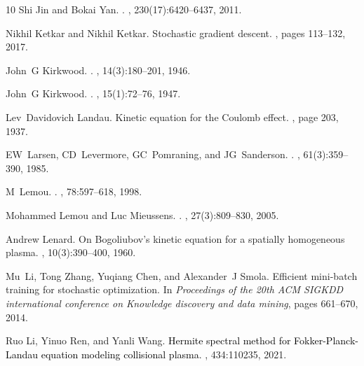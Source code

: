 \documentclass[preprint,1p,times]{elsarticle}
\theoremstyle{definition}
\theoremstyle{remark}
\newcommand{\tcr}[1]{\textcolor{black}{#1}}
\begin{document}
\begin{thebibliography}{10}
Shi Jin and Bokai Yan.
.
, 230(17):6420--6437, 2011.

Nikhil Ketkar and Nikhil Ketkar.
\newblock Stochastic gradient descent.
, pages
  113--132, 2017.

John~G Kirkwood.
.
, 14(3):180--201, 1946.

John~G Kirkwood.
.
, 15(1):72--76, 1947.

Lev~Davidovich Landau.
\newblock Kinetic equation for the {C}oulomb effect.
, page 203, 1937.

EW~Larsen, CD~Levermore, GC~Pomraning, and JG~Sanderson.
.
, 61(3):359--390, 1985.

M~Lemou.
.
, 78:597--618, 1998.

Mohammed Lemou and Luc Mieussens.
.
, 27(3):809--830, 2005.

Andrew Lenard.
\newblock On {B}ogoliubov's kinetic equation for a spatially homogeneous
  plasma.
, 10(3):390--400, 1960.

Mu~Li, Tong Zhang, Yuqiang Chen, and Alexander~J Smola.
\newblock Efficient mini-batch training for stochastic optimization.
\newblock In {\em Proceedings of the 20th ACM SIGKDD international conference
  on Knowledge discovery and data mining}, pages 661--670, 2014.

Ruo Li, Yinuo Ren, and Yanli Wang.
\newblock \tcr{{Hermite spectral method for {F}okker-{P}lanck-{L}andau equation
  modeling collisional plasma}}.
, 434:110235, 2021.


\end{thebibliography}
\end{document}
